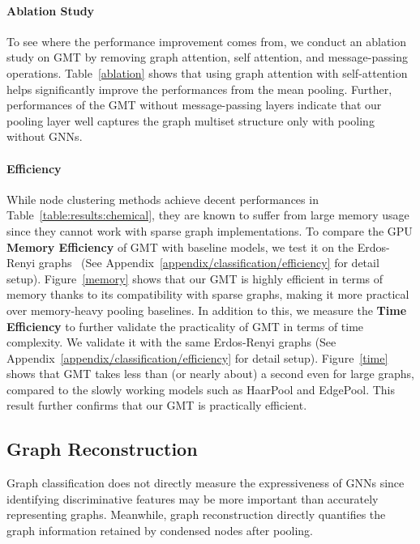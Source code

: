 \documentclass{article} \usepackage{iclr2021_conference,times}
\begin{document}
\paragraph{Ablation Study} To see where the performance improvement comes from, we conduct an ablation study on GMT by removing graph attention, self attention, and message-passing operations. Table~\ref{ablation} shows that using graph attention with self-attention helps significantly improve the performances from the mean pooling. Further, performances of the GMT without message-passing layers indicate that our pooling layer well captures the graph multiset structure only with pooling without GNNs. 


\vspace{-0.05in}
\paragraph{Efficiency} While node clustering methods achieve decent performances in Table~\ref{table:results:chemical}, they are known to suffer from large memory usage since they cannot work with sparse graph implementations. To compare the GPU \textbf{Memory Efficiency} of GMT with baseline models, we test it on the Erdos-Renyi graphs~\citep{randomgraph} (See Appendix~\ref{appendix/classification/efficiency} for detail setup). Figure~\ref{memory} shows that our GMT is highly efficient in terms of memory thanks to its compatibility with sparse graphs, making it more practical over memory-heavy pooling baselines. 
In addition to this, we measure the \textbf{Time Efficiency} to further validate the practicality of GMT in terms of time complexity. We validate it with the same Erdos-Renyi graphs (See Appendix~\ref{appendix/classification/efficiency} for detail setup). Figure~\ref{time} shows that GMT takes less than (or nearly about) a second even for large graphs, compared to the slowly working models such as HaarPool and EdgePool. This result further confirms that our GMT is practically efficient.

\subsection{Graph Reconstruction \label{experiment/recon}}
Graph classification does not directly measure the expressiveness of GNNs since identifying discriminative features may be more important than accurately representing graphs. Meanwhile, graph reconstruction directly quantifies the graph information retained by condensed nodes after pooling.
\end{document}
